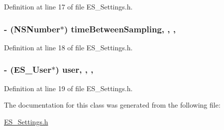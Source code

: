 Definition at line 17 of file E\+S\+\_\+\+Settings.\+h.

\hypertarget{interface_e_s___settings_a633234642f53c068c10772edd5e61cc1}{
\subsubsection[{time\+Between\+Sampling}]{\setlength{\rightskip}{0pt plus 5cm}-\/ (N\+S\+Number$\ast$) time\+Between\+Sampling\hspace{0.3cm}{\ttfamily [read]}, {\ttfamily [write]}, {\ttfamily [nonatomic]}, {\ttfamily [retain]}}}\label{interface_e_s___settings_a633234642f53c068c10772edd5e61cc1}


Definition at line 18 of file E\+S\+\_\+\+Settings.\+h.

\hypertarget{interface_e_s___settings_a337f820d30530c3423390ac4f57feca6}{
\subsubsection[{user}]{\setlength{\rightskip}{0pt plus 5cm}-\/ ({\bf E\+S\+\_\+\+User}$\ast$) user\hspace{0.3cm}{\ttfamily [read]}, {\ttfamily [write]}, {\ttfamily [nonatomic]}, {\ttfamily [retain]}}}\label{interface_e_s___settings_a337f820d30530c3423390ac4f57feca6}


Definition at line 19 of file E\+S\+\_\+\+Settings.\+h.



The documentation for this class was generated from the following file\+:\begin{DoxyCompactItemize}
\item 
\hyperlink{_e_s___settings_8h}{E\+S\+\_\+\+Settings.\+h}\end{DoxyCompactItemize}
